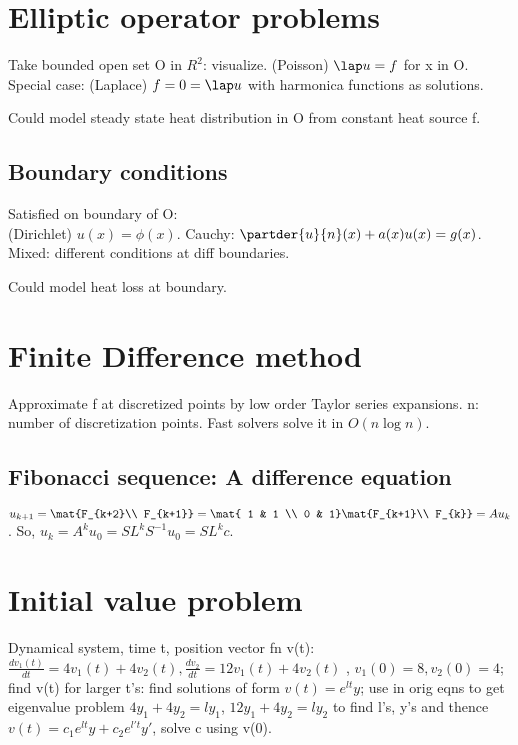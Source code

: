 \documentclass[oneside, article]{memoir}
\begin{document}
\section{Elliptic operator problems}
Take bounded open set O in $R^{2}$: visualize. (Poisson) $\lap u = f$ for x in O. Special case: (Laplace) $f = 0 = \lap u$ with harmonica functions as solutions.

Could model steady state heat distribution in O from constant heat source f.

\subsection{Boundary conditions}
Satisfied on boundary of O: \\
(Dirichlet) $u(x) = \phi(x)$. Cauchy: $\partder{u}{n}(x) + a(x)u(x) = g(x)$. Mixed: different conditions at diff boundaries.

Could model heat loss at boundary.

\section{Finite Difference method}
Approximate f at discretized points by low order Taylor series expansions. n: number of discretization points. Fast solvers solve it in $O(n \log n)$.

\subsection{Fibonacci sequence: A difference equation}
$u_{k+1} = \mat{F_{k+2}\\ F_{k+1}} \\
= \mat{ 1 & 1 \\ 0 & 1} \mat{F_{k+1}\\ F_{k}} =  Au_{k}$. So, $u_{k} = A^{k}u_{0} = SL^{k}S^{-1}u_{0} = SL^{k}c$.

\section{Initial value problem}
Dynamical system, time t, position vector fn v(t): $\frac{dv_{1}(t)}{dt} = 4v_{1}(t) +4v_{2}(t), \frac{dv_{2}}{dt} = 12v_{1}(t)+4v_{2}(t)$ , $v_{1}(0)= 8, v_{2}(0) =4$; find v(t) for larger t's: find solutions of form $v(t) = e^{lt}y$; use in orig eqns to get eigenvalue problem $4y_{1}+4y_{2} = ly_{1}$, $12y_{1}+4y_{2} = ly_{2}$ to find l's, y's and thence $v(t) = c_{1}e^{lt}y + c_{2}e^{l't}y'$, solve c using v(0).
\end{document}
